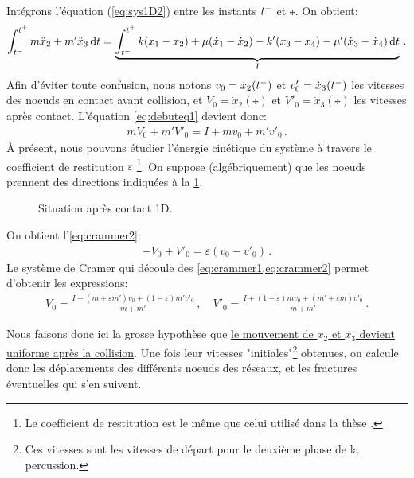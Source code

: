 \noindent Intégrons l'équation (\ref{eq:sys1D2}) entre les instants $t^{-}$ et $\tplus$. On obtient:
\begin{align}    \label{eq:debuteq1}
    \int_{\tmoins}^{\tplus} m\ddot x_2 + m'\ddot x_3 \diff t = \underbrace{\int_{\tmoins}^{\tplus} k(x_1 - x_2) + \mu (\dot x_1 - \dot x_2) - k'(x_3 - x_4) - \mu'(\dot x_3 - \dot x_4) \diff t}_{I} \,.
\end{align}
Afin d'éviter toute confusion, nous notons $v_0 = \dot{x}_2(t^{-})$ et $v'_0 = \dot{x}_3(t^{-})$ les vitesses des noeuds en contact avant collision, et $V_0 = \dot{x}_2(\tplus)$ et $V'_0 = \dot{x}_3(\tplus)$ les vitesses après contact. L'équation \cref{eq:debuteq1} devient donc:
\begin{align} \label{eq:crammer1}
    mV_0 + m'V'_0 = I + mv_0 + m'v'_0 \,.
\end{align}
À présent, nous pouvons étudier l'énergie cinétique du système à travers le coefficient de restitution $\varepsilon$ \footnote{Le coefficient de restitution est le même que celui utilisé dans la thèse \parencite{rabatel2015thesis}.}. On suppose (algébriquement) que les noeuds prennent des directions indiquées à la \cref{fig:contact1dapres}. 
\begin{figure}[!h]
    \centering
    \caption{Situation après contact 1D.}
    \label{fig:contact1dapres}
\end{figure}

\noindent On obtient l'\cref{eq:crammer2}:
\begin{align} \label{eq:crammer2}
    - V_0 + V'_0 = \varepsilon (v_0 - v'_0) \,.
\end{align}
Le système de Cramer qui découle des \cref{eq:crammer1,eq:crammer2} permet d'obtenir les expressions:
\begin{align}
    V_0 = \frac{I + (m+\varepsilon m')v_0 + (1-\varepsilon)m'v'_0}{m+m'} \,, \quad V'_0 = \frac{I + (1-\varepsilon)mv_0 + (m'+\varepsilon m)v'_0}{m+m'}\,.
\end{align}

Nous faisons donc ici la grosse hypothèse que \underline{le mouvement de $x_2$ et $x_3$ devient uniforme après la collision}. Une fois leur vitesses "initiales"\footnote{Ces vitesses sont les vitesses de départ pour le deuxième phase de la percussion.} obtenues, on calcule donc les déplacements des différents noeuds des réseaux, et les fractures éventuelles qui s'en suivent. 

